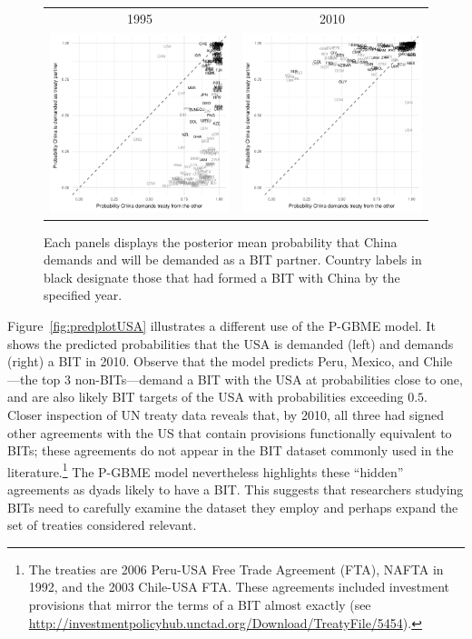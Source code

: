 \documentclass[a4paper, 12pt]{article}
\begin{document}
\begin{figure}[ht]
  \centering
  \begin{tabular}{cc}
    1995 & 2010 \\
    \includegraphics[width=.4\textwidth]{figure1_a.pdf} & 
    \includegraphics[width=.4\textwidth]{figure1_b.pdf} \\
  \end{tabular}
  \caption{Each panels displays the posterior mean probability that China demands and will be demanded as a BIT partner. Country labels in black designate those that had formed a BIT with China by the specified year.} 
  \label{fig:predplotCHN}
\end{figure}
\FloatBarrier

Figure~\ref{fig:predplotUSA} illustrates a different use of the P-GBME model.  It shows the predicted probabilities that the USA is demanded (left) and demands (right) a BIT in 2010.  Observe that the model predicts Peru, Mexico, and Chile---the top 3 non-BITs---demand a BIT with the USA at probabilities close to one, and are also likely BIT targets of the USA with probabilities exceeding $0.5$. Closer inspection of UN treaty data reveals that, by 2010, all three had signed other agreements with the US that contain provisions functionally equivalent to BITs; these agreements do not appear in the BIT dataset commonly used in the literature.\footnote{The treaties are 2006 Peru-USA Free Trade Agreement (FTA), NAFTA in 1992, and the 2003 Chile-USA FTA. These agreements included investment provisions that mirror the terms of a BIT almost exactly (see \url{http://investmentpolicyhub.unctad.org/Download/TreatyFile/5454}).} The P-GBME model nevertheless highlights these ``hidden'' agreements as dyads likely to have a BIT. This suggests that researchers studying BITs need to carefully examine the dataset they employ and perhaps expand the set of treaties considered relevant.
\end{document}
